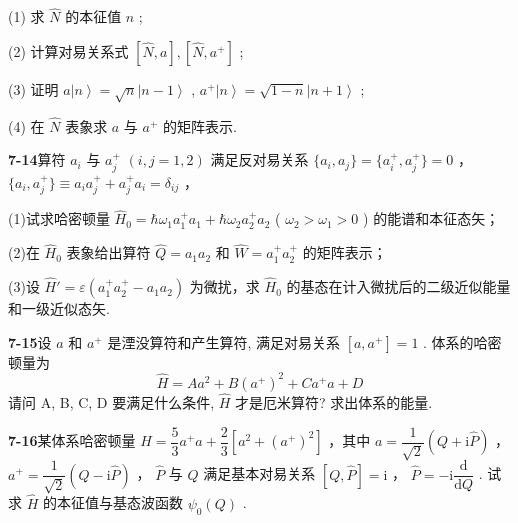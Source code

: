 (1) 求 $\displaystyle \hat{N}$ 的本征值 $\displaystyle n$ ;

(2) 计算对易关系式 $\displaystyle [\hat{N}, a], [\hat{N}, a^{+}]$ ;

(3) 证明 $\displaystyle a\left|n\right\rangle = \sqrt{n}\left|n - 1\right\rangle$ , $\displaystyle a^{+}\left|n\right\rangle = \sqrt{1 - n}\left|n + 1\right\rangle$ ;

(4) 在 $\displaystyle \hat{N}$ 表象求 $\displaystyle a$ 与 $\displaystyle a^{+}$ 的矩阵表示.

\vfill

\newpage

\textbf{7-14}\quad 算符 $\displaystyle a_{i}$ 与 $\displaystyle a_{j}^{+}$ $\displaystyle (i,j = 1,2)$ 满足反对易关系 $\displaystyle \{a_i,a_j\} = \{a_i^+,a_j^+\} = 0$ ， $\displaystyle \{a_i,a_j^+\} \equiv a_i a_j^+ + a_j^+ a_i = \delta_{ij}$ ，

(1)试求哈密顿量 $\displaystyle \hat{H}_0 = \hbar \omega_1 a_1^+ a_1 + \hbar \omega_2 a_2^+ a_2$ ( $\displaystyle \omega_2 > \omega_1 > 0$ ) 的能谱和本征态矢；

(2)在 $\displaystyle \hat{H}_0$ 表象给出算符 $\displaystyle \hat{Q} = a_1 a_2$ 和 $\displaystyle \hat{W} = a_1^+ a_2^+$ 的矩阵表示；

(3)设 $\displaystyle \hat{H}' = \varepsilon (a_1^+ a_2^+ - a_1 a_2)$ 为微扰，求 $\displaystyle \hat{H}_0$ 的基态在计入微扰后的二级近似能量和一级近似态矢.

\vfill

\newpage

\textbf{7-15}\quad 设 $\displaystyle a$ 和 $\displaystyle a^{+}$ 是湮没算符和产生算符, 满足对易关系 $\displaystyle [a, a^{+}] = 1$ . 体系的哈密顿量为
\begin{equation}\tag{1}
    \hat {H} = A a ^ {2} + B (a ^ {+}) ^ {2} + C a ^ {+} a + D
\end{equation}
请问 A, B, C, D 要满足什么条件, $\displaystyle \hat{H}$ 才是厄米算符? 求出体系的能量.

\vfill

\newpage

\textbf{7-16}\quad 某体系哈密顿量 $\displaystyle \hat{H} = \dfrac{5}{3} a^{+}a + \dfrac{2}{3} [a^{2} + (a^{+})^{2}]$ ，其中 $\displaystyle a = \dfrac{1}{\sqrt{2}} (Q + \mathrm{i}\hat{P})$ ， $\displaystyle a^{+} = \dfrac{1}{\sqrt{2}} (Q - \mathrm{i}\hat{P})$ ， $\displaystyle \hat{P}$ 与 $\displaystyle Q$ 满足基本对易关系 $\displaystyle [Q, \hat{P}] = \mathrm{i}$ ， $\displaystyle \hat{P} = -\mathrm{i}\dfrac{\mathrm{d}}{\mathrm{d}Q}$ . 试求 $\displaystyle \hat{H}$ 的本征值与基态波函数 $\displaystyle \psi_{0}(Q)$ .

